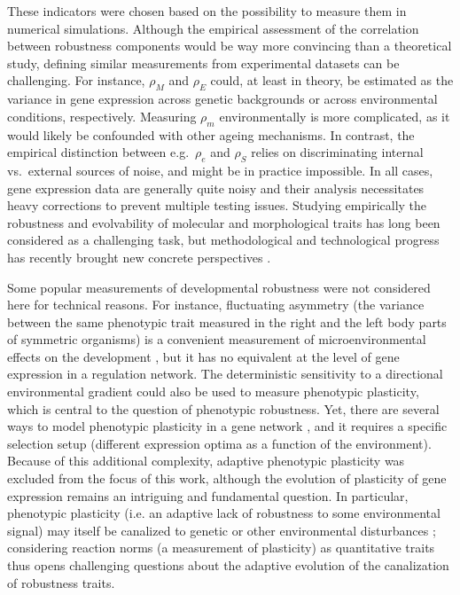 \documentclass[10pt,a4paper]{article}
\newcommand{\stability}{{\rho_S}}
\newcommand{\earlyenv}{{\rho_E}}
\newcommand{\lateenv}{{\rho_e}}
\newcommand{\earlymut}{{\rho_M}}
\newcommand{\latemut}{{\rho_m}}
\begin{document}
These indicators were chosen based on the possibility to measure them in numerical simulations. Although the empirical assessment of the correlation between robustness components would be way more convincing than a theoretical study, defining similar measurements from experimental datasets can be challenging. For instance, $\earlymut$ and $\earlyenv$ could, at least in theory, be estimated as the variance in gene expression across genetic backgrounds or across environmental conditions, respectively. Measuring $\latemut$ environmentally is more complicated, as it would likely be confounded with other ageing mechanisms. In contrast, the empirical distinction between e.g.\ $\lateenv$ and $\stability$ relies on discriminating internal vs.\ external sources of noise, and might be in practice impossible. In all cases, gene expression data are generally quite noisy and their analysis necessitates heavy corrections to prevent multiple testing issues. Studying empirically the robustness and evolvability of molecular and morphological traits has long been considered as a challenging task, but methodological and technological progress has recently brought new concrete perspectives \citep{PW19}. 

Some popular measurements of developmental robustness were not considered here for technical reasons. For instance, fluctuating asymmetry (the variance between the same phenotypic trait measured in the right and the left body parts of symmetric organisms) is a convenient measurement of microenvironmental effects on the development \citep{DD01,LK05}, but it has no equivalent at the level of gene expression in a regulation network. The deterministic sensitivity to a directional environmental gradient could also be used to measure phenotypic plasticity, which is central to the question of phenotypic robustness. Yet, there are several ways to model phenotypic plasticity in a gene network \citep{Mas04,BTL21}, and it requires a specific selection setup (different expression optima as a function of the environment). Because of this additional complexity, adaptive phenotypic plasticity was excluded from the focus of this work, although the evolution of plasticity of gene expression remains an intriguing and fundamental question. In particular, phenotypic plasticity (i.e. an adaptive lack of robustness to some environmental signal) may itself be canalized to genetic or other environmental disturbances \citep{SK94}; considering reaction norms (a measurement of plasticity) as quantitative traits thus opens challenging questions about the adaptive evolution of the canalization of robustness traits.
\end{document}
